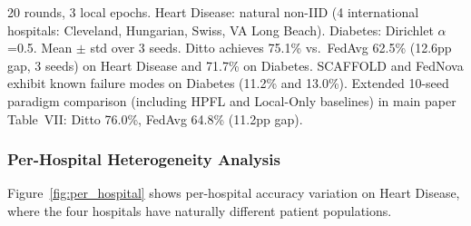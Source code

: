 \documentclass[conference]{IEEEtran}
\begin{document}
\begin{table}[htbp]
\centering
\caption{FL Algorithm Comparison on Heart Disease and Diabetes}
\label{tab:hd_diabetes}

\vspace{1mm}
\footnotesize{20 rounds, 3 local epochs. Heart Disease: natural non-IID (4 international hospitals: Cleveland, Hungarian, Swiss, VA Long Beach). Diabetes: Dirichlet $\alpha$=0.5. Mean $\pm$ std over 3 seeds. Ditto achieves 75.1\% vs.\ FedAvg 62.5\% (12.6pp gap, 3 seeds) on Heart Disease and 71.7\% on Diabetes. SCAFFOLD and FedNova exhibit known failure modes on Diabetes (11.2\% and 13.0\%). Extended 10-seed paradigm comparison (including HPFL and Local-Only baselines) in main paper Table~VII: Ditto 76.0\%, FedAvg 64.8\% (11.2pp gap).}
\end{table}

\subsubsection{Per-Hospital Heterogeneity Analysis}

Figure~\ref{fig:per_hospital} shows per-hospital accuracy variation on Heart Disease, where the four hospitals have naturally different patient populations.
\end{document}
